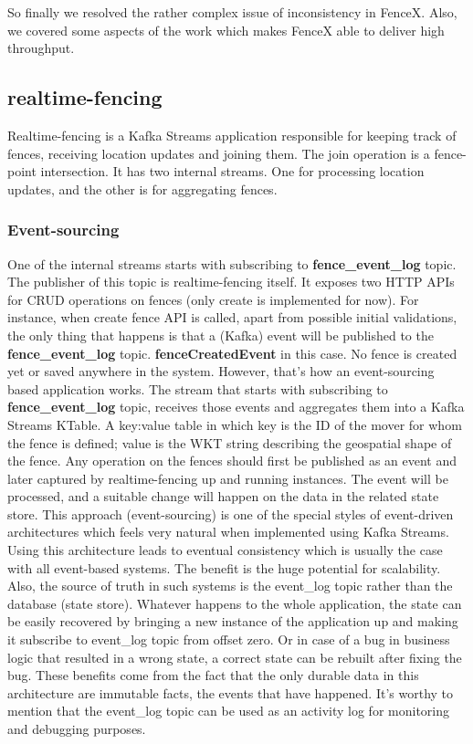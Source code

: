 \documentclass[a4]{report}
\begin{document}
    So finally we resolved the rather complex issue of inconsistency in FenceX.
    Also, we covered some aspects of the work which makes FenceX able to deliver high throughput.

    \subsection{realtime-fencing}
    Realtime-fencing is a Kafka Streams application responsible for keeping track of fences, receiving location updates
    and joining them.
    The join operation is a fence-point intersection.
    It has two internal streams.
    One for processing location updates, and the other is for aggregating fences.

    \subsubsection{Event-sourcing}
    One of the internal streams starts with subscribing to \textbf{fence\_event\_log} topic.
    The publisher of this topic is realtime-fencing itself.
    It exposes two HTTP APIs for CRUD operations on fences (only create is implemented for now).
    For instance, when create fence API is called, apart from possible initial validations, the only thing that happens is that a (Kafka) event will be published to the \textbf{fence\_event\_log} topic.
    \textbf{fenceCreatedEvent} in this case.
    No fence is created yet or saved anywhere in the system. However, that's how an event-sourcing based application
    works.
    The stream that starts with subscribing to \textbf{fence\_event\_log} topic, receives those events and aggregates
    them into a Kafka Streams KTable.
    A key:value table in which key is the ID of the mover for whom the fence is defined;
    value is the WKT string describing the geospatial shape of the fence.
    Any operation on the fences should first be published as an event and later captured by realtime-fencing up and
    running instances.
    The event will be processed, and a suitable change will happen on the data in the related state store.
    This approach (event-sourcing) is one of the special styles of event-driven architectures which feels very natural when implemented using Kafka Streams.
    Using this architecture leads to eventual consistency which is usually the case with all event-based systems.
    The benefit is the huge potential for scalability.
    Also, the source of truth in such systems is the event\_log topic rather than the database (state store).
    Whatever happens to the whole application, the state can be easily recovered by bringing a new instance of the application up and making it subscribe to event\_log topic from offset zero.
    Or in case of a bug in business logic that resulted in a wrong state, a correct state can be rebuilt after fixing
    the bug.
    These benefits come from the fact that the only durable data in this architecture are immutable facts, the
    events that have happened.
    It's worthy to mention that the event\_log topic can be used as an activity log for monitoring and debugging purposes.
\end{document}
